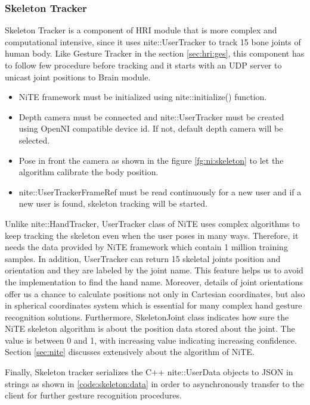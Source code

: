 \subsubsection{Skeleton Tracker}
Skeleton Tracker is a component of HRI module that is more complex and computational intensive, since it uses nite::UserTracker to track 15 bone joints of human body. Like Gesture Tracker in the section \ref{sec:hri:ges}, this component has to follow few procedure before tracking and it starts with an UDP server to unicast joint positions to Brain module.
 
 \begin{itemize}
 	\item NiTE framework must be initialized using nite::initialize() function.
 	\item Depth camera must be connected and nite::UserTracker must be created using OpenNI compatible  device id. If not, default depth camera will be selected.
 	\item Pose in front the camera as shown in the figure \ref{fg:ni:skeleton} to let the algorithm calibrate the body position. 
 	\item nite::UserTrackerFrameRef must be read continuously for a new user and if a new user is found, skeleton tracking will be started.
 \end{itemize}
 
 
 
 Unlike nite::HandTracker, UserTracker class of NiTE uses complex algorithms to keep tracking the skeleton even when the user poses in many ways. Therefore, it needs the data provided by NiTE framework which contain 1 million training samples. In addition, UserTracker can return 15 skeletal joints position and orientation and they are labeled by the joint name. This feature helps us to avoid the implementation to find the hand name. Moreover, details of joint orientations offer us a chance to calculate positions not only in Cartesian coordinates, but also in spherical coordinates system which is essential for many complex hand gesture recognition solutions. Furthermore, SkeletonJoint class indicates how sure the NiTE skeleton algorithm is about the position data stored about the joint. The value is between 0 and 1, with increasing value indicating increasing confidence. Section \ref{sec:nite} discusses extensively about the algorithm of NiTE.
 
 Finally, Skeleton tracker serializes the C++ nite::UserData objects to JSON in strings  as shown in \ref{code:skeleton:data} in order to asynchronously transfer to the client for further gesture recognition procedures.
 
